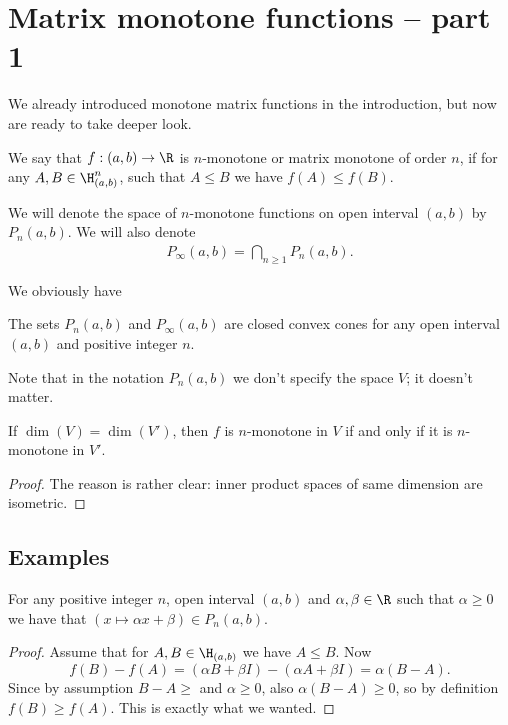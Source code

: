 \chapter{Matrix monotone functions -- part 1}

We already introduced monotone matrix functions in the introduction, but now are ready to take deeper look. 

\begin{maar}
	We say that $f : (a, b) \to \R$ is $n$-monotone or matrix monotone of order $n$, if for any $A, B \in \H^{n}_{(a, b)}$, such that $A \leq B$ we have $f(A) \leq f(B)$.
\end{maar}

We will denote the space of $n$-monotone functions on open interval $(a, b)$ by $P_{n}(a, b)$. We will also denote
\begin{align*}
	P_{\infty}(a, b) = \bigcap_{n \geq 1} P_{n}(a, b).
\end{align*}

We obviously have

\begin{prop}
	The sets $P_{n}(a, b)$ and $P_{\infty}(a, b)$ are closed convex cones for any open interval $(a, b)$ and positive integer $n$.
\end{prop}

Note that in the notation $P_{n}(a, b)$ we don't specify the space $V$; it doesn't matter.

\begin{prop}
	If $\dim(V) = \dim(V')$, then $f$ is $n$-monotone in $V$ if and only if it is $n$-monotone in $V'$.
\end{prop}
\begin{proof}
	The reason is rather clear: inner product spaces of same dimension are isometric.
\end{proof}

\section{Examples}

\begin{esim}
	For any positive integer $n$, open interval $(a, b)$ and $\alpha, \beta \in \R$ such that $\alpha \geq 0$ we have that $(x \mapsto \alpha x + \beta) \in P_{n}(a, b)$.
\end{esim}
\begin{proof}
	Assume that for $A, B \in \H_{(a, b)}$ we have $A \leq B$. Now
	\[
		f(B) - f(A) = (\alpha B + \beta I) - (\alpha A + \beta I) = \alpha (B - A).
	\]
	Since by assumption $B - A \geq $ and $\alpha \geq 0$, also $\alpha (B - A) \geq 0$, so by definition $f(B) \geq f(A)$. This is exactly what we wanted.
\end{proof}

